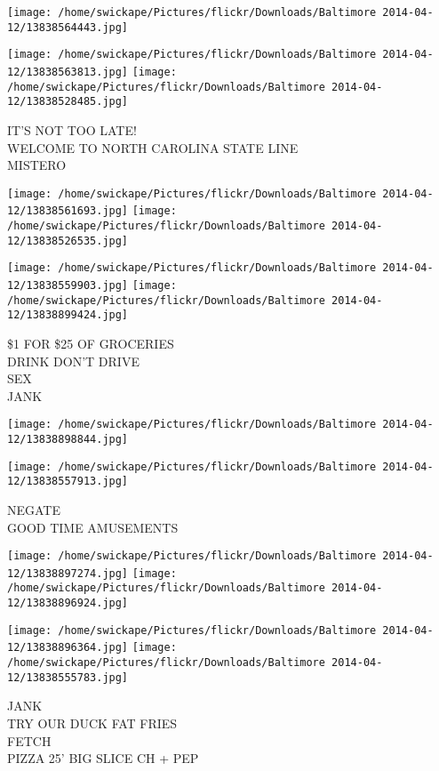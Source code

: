 \documentclass[10pt,letterpaper]{article}
\begin{document}
\texttt{[image: /home/swickape/Pictures/flickr/Downloads/Baltimore 2014-04-12/13838564443.jpg]}

\vspace{0.25in}
\texttt{[image: /home/swickape/Pictures/flickr/Downloads/Baltimore 2014-04-12/13838563813.jpg]}
\texttt{[image: /home/swickape/Pictures/flickr/Downloads/Baltimore 2014-04-12/13838528485.jpg]}

IT'S NOT TOO LATE!\\
WELCOME TO NORTH CAROLINA STATE LINE\\
MISTERO\\
\pagebreak

\texttt{[image: /home/swickape/Pictures/flickr/Downloads/Baltimore 2014-04-12/13838561693.jpg]}
\texttt{[image: /home/swickape/Pictures/flickr/Downloads/Baltimore 2014-04-12/13838526535.jpg]}

\texttt{[image: /home/swickape/Pictures/flickr/Downloads/Baltimore 2014-04-12/13838559903.jpg]}
\texttt{[image: /home/swickape/Pictures/flickr/Downloads/Baltimore 2014-04-12/13838899424.jpg]}

\$1 FOR \$25 OF GROCERIES\\
DRINK DON'T DRIVE\\
SEX\\
JANK\\
\pagebreak

\texttt{[image: /home/swickape/Pictures/flickr/Downloads/Baltimore 2014-04-12/13838898844.jpg]}

\vspace{0.25in}
\texttt{[image: /home/swickape/Pictures/flickr/Downloads/Baltimore 2014-04-12/13838557913.jpg]}

NEGATE\\
GOOD TIME AMUSEMENTS\\
\pagebreak

\texttt{[image: /home/swickape/Pictures/flickr/Downloads/Baltimore 2014-04-12/13838897274.jpg]}
\texttt{[image: /home/swickape/Pictures/flickr/Downloads/Baltimore 2014-04-12/13838896924.jpg]}

\texttt{[image: /home/swickape/Pictures/flickr/Downloads/Baltimore 2014-04-12/13838896364.jpg]}
\texttt{[image: /home/swickape/Pictures/flickr/Downloads/Baltimore 2014-04-12/13838555783.jpg]}

JANK\\
TRY OUR DUCK FAT FRIES\\
FETCH\\
PIZZA 25' BIG SLICE CH + PEP\\
\pagebreak
\end{document}
